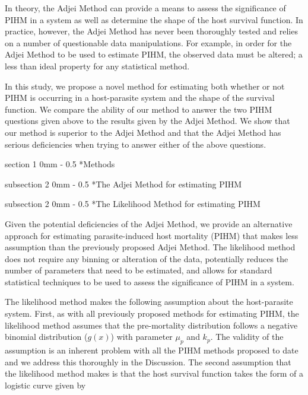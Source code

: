 \documentclass[12pt, a4paper]{article}
\makeatletter
\renewcommand{\section}{\@startsection
{section}%
{1}%
{0mm}%
{-\baselineskip}%
{0.5\baselineskip}%
{\normalfont\bf\large}} %
\renewcommand{\subsection}{\@startsection
{subsection}%
{2}%
{0mm}%
{-\baselineskip}%
{0.5\baselineskip}%
{\normalfont\bf}} %
\makeatother
\begin{document}
In theory, the Adjei Method can provide a means to assess the significance of
PIHM in a system as well as determine the shape of the host survival function.
In practice, however, the Adjei Method has never been thoroughly tested and
relies on a number of questionable data manipulations.  For example, in order
for the Adjei Method to be used to estimate PIHM, the observed data must be
altered; a less than ideal property for any statistical method.

In this study, we propose a novel method for estimating both whether or
not PIHM is occurring in a host-parasite system and the shape of the survival
function.  We compare the ability of our method to answer the two PIHM
questions given above to the results given by the Adjei Method.  We show that
our method is superior to the Adjei Method and that the Adjei Method has
serious deficiencies when trying to answer either of the above questions.

\section*{Methods}

\subsection*{The Adjei Method for estimating PIHM}



\subsection*{The Likelihood Method for estimating PIHM}

Given the potential deficiencies of the Adjei Method, we provide an alternative
approach for estimating parasite-induced host mortality (PIHM) that makes less
assumption than the previously proposed Adjei Method.  The likelihood method
does not require any binning or alteration of the data, potentially reduces the
number of parameters that need to be estimated, and allows for standard
statistical techniques to be used to assess the significance of PIHM in a
system.

The likelihood method makes the following assumption about the host-parasite
system. First, as with all previously proposed methods for estimating PIHM, the
likelihood method assumes that the pre-mortality distribution follows a
negative binomial distribution ($g(x)$) with parameter $\mu_p$ and $k_p$. The
validity of the assumption is an inherent problem with all the PIHM methods
proposed to date and we address this thoroughly in the Discussion. The second
assumption that the likelihood method makes is that the host survival function
takes the form of a logistic curve given by
\end{document}
